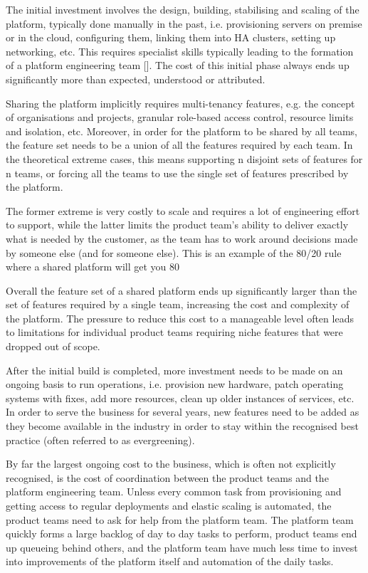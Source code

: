 \documentclass[reprint,amsmath,amssymb,aps]{revtex4-1}
\begin{document}
The initial investment involves the design, building, stabilising and scaling of the platform, typically done manually in the past, i.e. provisioning servers on premise or in the cloud, configuring them, linking them into HA clusters, setting up networking, etc. This requires specialist skills typically leading to the formation of a platform engineering team []. The cost of this initial phase always ends up significantly more than expected, understood or attributed.

Sharing the platform implicitly requires multi-tenancy features, e.g. the concept of organisations and projects, granular role-based access control, resource limits and isolation, etc. Moreover, in order for the platform to be shared by all teams, the feature set needs to be a union of all the features required by each team. In the theoretical extreme cases, this means supporting n disjoint sets of features for n teams, or forcing all the teams to use the single set of features prescribed by the platform. 

The former extreme is very costly to scale and requires a lot of engineering effort to support, while the latter limits the product team’s ability to deliver exactly what is needed by the customer, as the team has to work around decisions made by someone else (and for someone else). This is an example of the 80/20 rule where a shared platform will get you 80%

Overall the feature set of a shared platform ends up significantly larger than the set of features required by a single team, increasing the cost and complexity of the platform. The pressure to reduce this cost to a manageable level often leads to limitations for individual product teams requiring niche features that were dropped out of scope.

After the initial build is completed, more investment needs to be made on an ongoing basis to run operations, i.e. provision new hardware, patch operating systems with fixes, add more resources, clean up older instances of services, etc. In order to serve the business for several years, new features need to be added as they become available in the industry in order to stay within the recognised best practice (often referred to as evergreening).

By far the largest ongoing cost to the business, which is often not explicitly recognised, is the cost of coordination between the product teams and the platform engineering team. Unless every common task from provisioning and getting access to regular deployments and elastic scaling is automated, the product teams need to ask for help from the platform team. The platform team quickly forms a large backlog of day to day tasks to perform, product teams end up queueing behind others, and the platform team have much less time to invest into improvements of the platform itself and automation of the daily tasks. 
\end{document}
